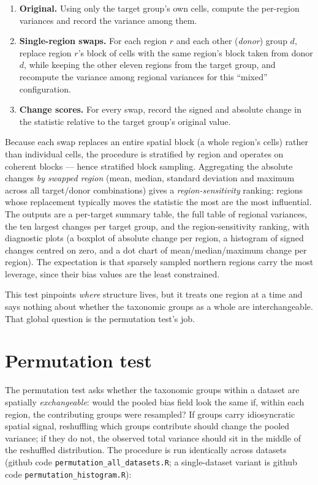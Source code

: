 \begin{enumerate}
  \item \textbf{Original.} Using only the target group's own cells, compute
        the per-region variances and record the variance among them.
  \item \textbf{Single-region swaps.} For each region $r$ and each other
        (\emph{donor}) group $d$, replace region $r$'s block of cells with
        the same region's block taken from donor $d$, while keeping the
        other eleven regions from the target group, and recompute the
        variance among regional variances for this ``mixed'' configuration.
  \item \textbf{Change scores.} For every swap, record the signed and
        absolute change in the statistic relative to the target group's
        original value.
\end{enumerate}

\noindent
Because each swap replaces an entire spatial block (a whole region's cells)
rather than individual cells, the procedure is stratified by region and
operates on coherent blocks --- hence stratified block sampling. Aggregating
the absolute changes \emph{by swapped region} (mean, median, standard
deviation and maximum across all target/donor combinations) gives a
\emph{region-sensitivity} ranking: regions whose replacement typically moves
the statistic the most are the most influential. The outputs are a
per-target summary table, the full table of regional variances, the ten
largest changes per target group, and the region-sensitivity ranking, with
diagnostic plots (a boxplot of absolute change per region, a histogram of
signed changes centred on zero, and a dot chart of mean/median/maximum
change per region). The expectation is that sparsely sampled northern
regions carry the most leverage, since their bias values are the least
constrained.

This test pinpoints \emph{where} structure lives, but it treats one region
at a time and says nothing about whether the taxonomic groups as a whole are
interchangeable. That global question is the permutation test's job.

\section{Permutation test}
\label{sec:permutation}

The permutation test asks whether the taxonomic groups within a dataset are
spatially \emph{exchangeable}: would the pooled bias field look the same if,
within each region, the contributing groups were resampled? If groups carry
idiosyncratic spatial signal, reshuffling which groups contribute should
change the pooled variance; if they do not, the observed total variance
should sit in the middle of the reshuffled distribution. The procedure is
run identically across datasets (github code
\texttt{permutation\_all\_datasets.R}; a single-dataset variant is github
code \texttt{permutation\_histogram.R}):

